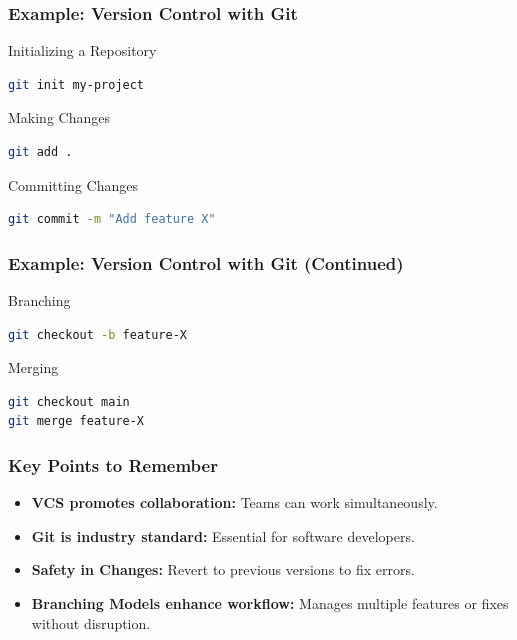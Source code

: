 \documentclass{beamer}
\begin{document}
\begin{frame}[fragile]
    \frametitle{Example: Version Control with Git}
    \begin{block}{Initializing a Repository}
        \begin{lstlisting}[language=bash]
git init my-project
        \end{lstlisting}
    \end{block}

    \begin{block}{Making Changes}
        \begin{lstlisting}[language=bash]
git add .
        \end{lstlisting}
    \end{block}

    \begin{block}{Committing Changes}
        \begin{lstlisting}[language=bash]
git commit -m "Add feature X"
        \end{lstlisting}
    \end{block}
\end{frame}

\begin{frame}[fragile]
    \frametitle{Example: Version Control with Git (Continued)}
    \begin{block}{Branching}
        \begin{lstlisting}[language=bash]
git checkout -b feature-X
        \end{lstlisting}
    \end{block}

    \begin{block}{Merging}
        \begin{lstlisting}[language=bash]
git checkout main
git merge feature-X
        \end{lstlisting}
    \end{block}
\end{frame}

\begin{frame}[fragile]
    \frametitle{Key Points to Remember}
    \begin{itemize}
        \item \textbf{VCS promotes collaboration:} Teams can work simultaneously.
        \item \textbf{Git is industry standard:} Essential for software developers.
        \item \textbf{Safety in Changes:} Revert to previous versions to fix errors.
        \item \textbf{Branching Models enhance workflow:} Manages multiple features or fixes without disruption.
    \end{itemize}
\end{frame}
\end{document}
